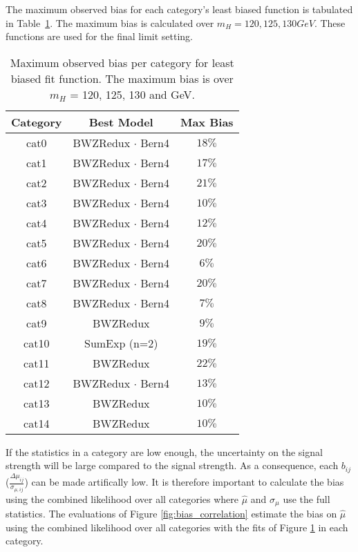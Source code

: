 The maximum observed bias for each category's least biased function is tabulated in Table~\ref{tab:bias}. The maximum bias is calculated over $m_H = 120, 125, 130 GeV$. These functions are used for the final limit setting. 
\begin{table}[h!]
    \centering
    \caption{Maximum observed bias per category for least biased fit function. The maximum bias is over $m_H$ = 120, 125, 130 and GeV.}
    \label{tab:bias}
    \begin{tabular}{ccc}
        \hline
        Category & Best Model & Max Bias \\
        \hline
        cat0  & BWZRedux $\cdot$ Bern4 & $18\%$ \\
        cat1  & BWZRedux $\cdot$ Bern4 & $17\%$ \\
        cat2  & BWZRedux $\cdot$ Bern4 & $21\%$ \\
        cat3  & BWZRedux $\cdot$ Bern4 & $10\%$ \\
        cat4  & BWZRedux $\cdot$ Bern4 & $12\%$ \\
        cat5  & BWZRedux $\cdot$ Bern4 & $20\%$ \\
        cat6  & BWZRedux $\cdot$ Bern4 & $6\%$  \\
        cat7  & BWZRedux $\cdot$ Bern4 & $20\%$ \\
        cat8  & BWZRedux $\cdot$ Bern4 & $7\%$  \\
        cat9  & BWZRedux               & $9\%$  \\
        cat10 & SumExp (n=2)           & $19\%$ \\
        cat11 & BWZRedux               & $22\%$ \\
        cat12 & BWZRedux $\cdot$ Bern4 & $13\%$ \\
        cat13 & BWZRedux               & $10\%$ \\
        cat14 & BWZRedux               & $10\%$ \\
        \hline
    \end{tabular}
\end{table}
If the statistics in a category are low enough, the uncertainty on the signal strength will be large compared to the signal strength. As a consequence, each $b_{ij}$ ($\frac{\Delta\mu_{ij}}{\sigma_{\mu,ij}}$) can be made artifically low. It is therefore important to calculate the bias using the combined likelihood over all categories where $\hat{\mu}$ and $\sigma_\mu$ use the full statistics. The evaluations of Figure \ref{fig:bias_correlation} estimate the bias on $\hat{\mu}$ using the combined likelihood over all categories with the fits of Figure \ref{tab:bias} in each category.  
